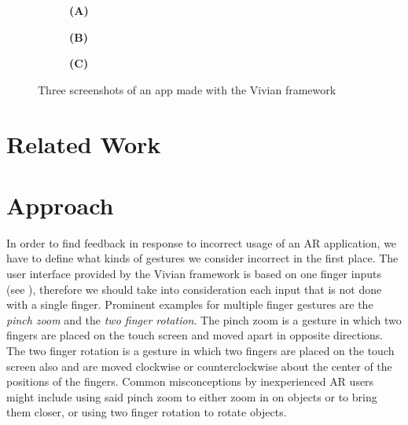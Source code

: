 \documentclass[11pt, a4paper]{article}
\begin{document}
\begin{figure}[H]
			\begin{subfigure}[t]{.32\textwidth}\centering
				\textbf{(A)}
			\end{subfigure}
			\begin{subfigure}[t]{.32\textwidth}\centering
				\textbf{(B)}
			\end{subfigure}
			\begin{subfigure}[t]{.32\textwidth}\centering
				\textbf{(C)}
			\end{subfigure}
			\caption{Three screenshots of an app made with the Vivian framework}
			\label{fig:feedbackonphone}
		\end{figure}

	\section*{Related Work}\label{sec:relatedwork}


	\section*{Approach}\label{sec:approach}
		In order to find feedback in response to incorrect usage of an \ac{AR} application, we have to define what kinds of gestures we consider incorrect in the first place. The user interface provided by the Vivian framework is based on one finger inputs (see ), therefore we should take into consideration each input that is not done with a single finger. Prominent examples for multiple finger gestures are the \emph{pinch zoom} and the \emph{two finger rotation}. The pinch zoom is a gesture in which two fingers are placed on the touch screen and moved apart in opposite directions. The two finger rotation is a gesture in which two fingers are placed on the touch screen also and are moved clockwise or counterclockwise about the center of the positions of the fingers. Common misconceptions by inexperienced \ac{AR} users might include using said pinch zoom to either zoom in on objects or to bring them closer, or using two finger rotation to rotate objects.
\end{document}
